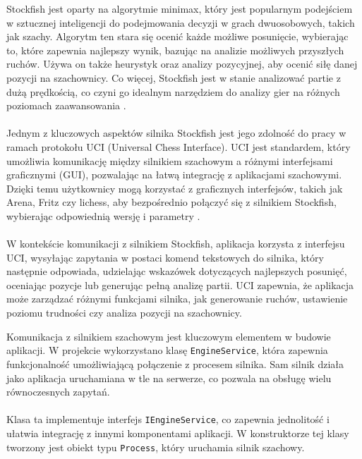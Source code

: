 \documentclass[twoside]{projektInzynierskiMS1}
\begin{document}
\noindent
Stockfish jest oparty na algorytmie minimax, który jest popularnym podejściem w sztucznej inteligencji do podejmowania decyzji w grach dwuosobowych, takich jak szachy. Algorytm ten stara się ocenić każde możliwe posunięcie, wybierając to, które zapewnia najlepszy wynik, bazując na analizie możliwych przyszłych ruchów. Używa on także heurystyk oraz analizy pozycyjnej, aby ocenić siłę danej pozycji na szachownicy. Co więcej, Stockfish jest w stanie analizować partie z dużą prędkością, co czyni go idealnym narzędziem do analizy gier na różnych poziomach zaawansowania \cite{StockfishDocs}.
\\\\
Jednym z kluczowych aspektów silnika Stockfish jest jego zdolność do pracy w ramach protokołu UCI (Universal Chess Interface). UCI jest standardem, który umożliwia komunikację między silnikiem szachowym a różnymi interfejsami graficznymi (GUI), pozwalając na łatwą integrację z aplikacjami szachowymi. Dzięki temu użytkownicy mogą korzystać z graficznych interfejsów, takich jak Arena, Fritz czy lichess, aby bezpośrednio połączyć się z silnikiem Stockfish, wybierając odpowiednią wersję i parametry \cite{StockfishUCI}.
\\\\
W kontekście komunikacji z silnikiem Stockfish, aplikacja korzysta z interfejsu UCI, wysyłając zapytania w postaci komend tekstowych do silnika, który następnie odpowiada, udzielając wskazówek dotyczących najlepszych posunięć, oceniając pozycje lub generując pełną analizę partii. UCI zapewnia, że aplikacja może zarządzać różnymi funkcjami silnika, jak generowanie ruchów, ustawienie poziomu trudności czy analiza pozycji na szachownicy.

\newpage

\noindent
Komunikacja z silnikiem szachowym jest kluczowym elementem w budowie aplikacji. W projekcie wykorzystano klasę \texttt{EngineService}, która zapewnia funkcjonalność umożliwiającą połączenie z procesem silnika. Sam silnik działa jako aplikacja uruchamiana w tle na serwerze, co pozwala na obsługę wielu równoczesnych zapytań.
\\\\
Klasa ta implementuje interfejs \texttt{IEngineService}, co zapewnia jednolitość i ułatwia integrację z innymi komponentami aplikacji. W konstruktorze tej klasy tworzony jest obiekt typu \texttt{Process}, który uruchamia silnik szachowy.
\end{document}
